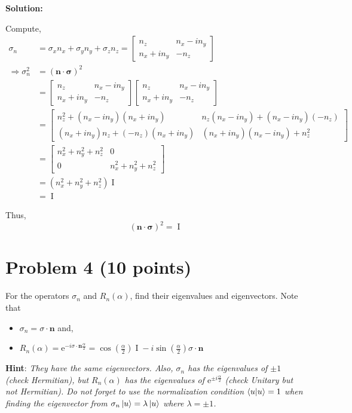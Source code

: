 \documentclass[11pt]{article}
\newenvironment{solution}
{\par\noindent\textbf{Solution:}\par}
{\vspace{1em}}
\begin{document}
\begin{solution}
Compute,
\[\begin{aligned}
\sigma_n &= \sigma_x n_x + \sigma_y n_y + \sigma_z n_z = \begin{bmatrix}n_z & n_x - i n_y \\ n_x + i n_y & -n_z\end{bmatrix} \\
\Rightarrow \sigma_n^2 &= (\boldsymbol{n} \cdot \boldsymbol{\sigma})^2 \\
&= \begin{bmatrix}n_z & n_x - i n_y \\ n_x + i n_y & -n_z\end{bmatrix} \begin{bmatrix}n_z & n_x - i n_y \\ n_x + i n_y & -n_z\end{bmatrix} \\
&= \begin{bmatrix}n_z^2 + (n_x - i n_y)(n_x + i n_y) & n_z(n_x - i n_y) + (n_x - i n_y)(-n_z) \\ (n_x + i n_y)n_z + (-n_z)(n_x + i n_y) & (n_x +i n_y)(n_x - i n_y) + n_z^2\end{bmatrix} \\
&= \begin{bmatrix}n_x^2 + n_y^2 + n_z^2 & 0 \\ 0 & n_x^2 + n_y^2 + n_z^2\end{bmatrix} \\
&= (n_x^2 + n_y^2 + n_z^2)\operatorname{I} \\
&= \operatorname{I}
\end{aligned}\]

Thus, \[\boxed{(\boldsymbol{n} \cdot \boldsymbol{\sigma})^2 = \operatorname{I}}\]

\end{solution}

\section*{Problem 4 (10 points)}

For the operators $\sigma_n$ and $R_n(\alpha)$, find their eigenvalues and eigenvectors. Note that
\begin{itemize}
    \item $\sigma_n = \sigma \cdot \boldsymbol{n}$ and, 
    \item $R_n(\alpha) = \mathrm{e}^{-i \sigma \cdot \boldsymbol{n} \frac{\alpha}{2}} = \cos(\frac{\alpha}{2}) \operatorname{I} - i \sin(\frac{\alpha}{2}) \sigma \cdot \boldsymbol{n}$
\end{itemize}
\textbf{Hint}: \textit{They have the same eigenvectors. Also, $\sigma_n$ has the eigenvalues of $\pm 1$ (check
Hermitian), but $R_n(\alpha)$ has the eigenvalues of $\mathrm{e}^{\pm i \frac{\alpha}{2}}$ (check Unitary but not Hermitian). Do not forget to use the normalization condition $\braket{u} = 1$ when finding the eigenvector
from $\sigma_n \ket{u} = \lambda \ket{u}$ where $\lambda = \pm 1$.}
\end{document}
